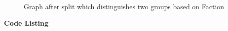 \begin{itemize}
\begin{figure}[h!]
\begin{center}
\caption{Graph after split which distinguishes two groups based on Faction}
\label{fig:q1fig01}
\end{center}
\end{figure}
\end{itemize}

\newpage
\textbf{Code Listing}
\sloppy



